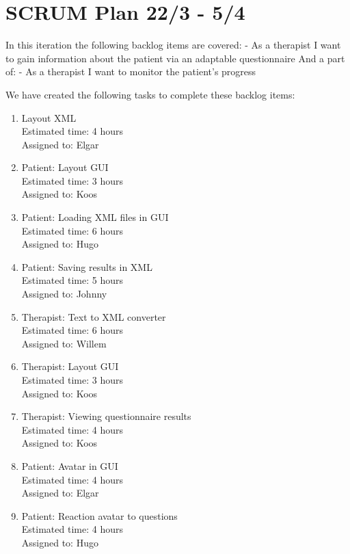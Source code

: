 \section*{SCRUM Plan 22/3 - 5/4}

In this iteration the following backlog items are covered: 
- As a therapist I want to gain information about the patient via an adaptable questionnaire
And a part of:
-  As a therapist I want to monitor the patient's progress

We have created the following tasks to complete these backlog items:

\begin{enumerate}
\item Layout XML\\
Estimated time: 4 hours\\
Assigned to: Elgar

\item Patient: Layout GUI\\
Estimated time: 3 hours\\
Assigned to: Koos

\item Patient: Loading XML files in GUI\\
Estimated time: 6 hours\\
Assigned to: Hugo

\item Patient: Saving results in XML\\
Estimated time: 5 hours\\
Assigned to: Johnny

\item Therapist: Text to XML converter\\
Estimated time: 6 hours\\
Assigned to: Willem

\item Therapist: Layout GUI\\
Estimated time: 3 hours\\
Assigned to: Koos

\item Therapist: Viewing questionnaire results\\
Estimated time: 4 hours\\
Assigned to: Koos

\item Patient: Avatar in GUI\\
Estimated time: 4 hours\\
Assigned to: Elgar

\item Patient: Reaction avatar to questions\\
Estimated time: 4 hours\\
Assigned to: Hugo
\end{enumerate}

